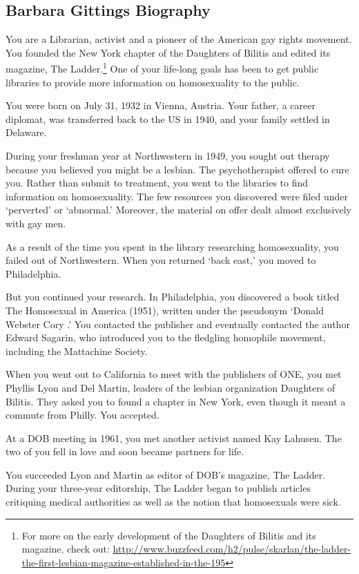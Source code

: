 \begin{refsection}
\section{Barbara Gittings Biography}
\label{barbaragittingsbiography}

You are a Librarian, activist and a pioneer of the American gay rights movement. You founded the New York chapter of the Daughters of Bilitis and edited its magazine, The Ladder.\footnote{For more on the early development of the Daughters of Bilitis and its magazine, check out: \url{http://www.buzzfeed.com/h2/pulse/skarlan/the-ladder-the-first-lesbian-magazine-established-in-the-195}} One of your life-long goals has been to get public libraries to provide more information on homosexuality to the public.

You were born on July 31, 1932 in Vienna, Austria. Your father, a career diplomat, was transferred back to the US in 1940, and your family settled in Delaware.

During your freshman year at Northwestern in 1949, you sought out therapy because you believed you might be a lesbian. The psychotherapist offered to cure you. Rather than submit to treatment, you went to the libraries to find information on homosexuality. The few resources you discovered were filed under `perverted' or `abnormal.' Moreover, the material on offer dealt almost exclusively with gay men.

As a result of the time you spent in the library researching homosexuality, you failed out of Northwestern. When you returned `back east,' you moved to Philadelphia.

But you continued your research. In Philadelphia, you discovered a book titled The Homosexual in America (1951), written under the pseudonym `Donald Webster Cory .' You contacted the publisher and eventually contacted the author Edward Sagarin, who introduced you to the fledgling homophile movement, including the Mattachine Society.

When you went out to California to meet with the publishers of ONE, you met Phyllis Lyon and Del Martin, leaders of the lesbian organization Daughters of Bilitis. They asked you to found a chapter in New York, even though it meant a commute from Philly. You accepted. 

At a DOB meeting in 1961, you met another activist named Kay Lahusen. The two of you fell in love and soon became partners for life.

You succeeded Lyon and Martin as editor of DOB's magazine, The Ladder. During your three-year editorship, The Ladder began to publish articles critiquing medical authorities as well as the notion that homosexuals were sick.


\end{refsection}
